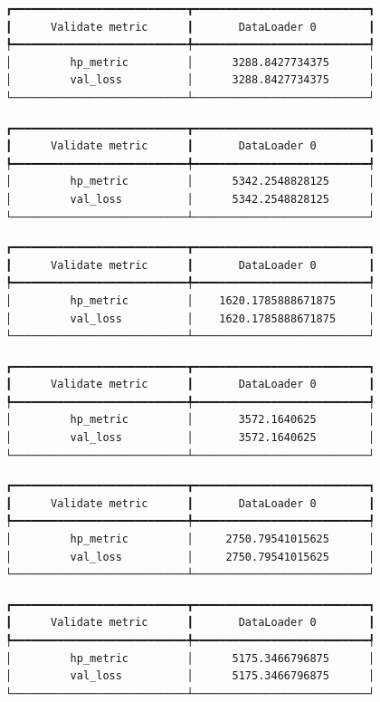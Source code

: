 \documentclass[
  letterpaper,
  DIV=11,
  numbers=noendperiod]{scrreprt}
\begin{document}
\begin{verbatim}
┏━━━━━━━━━━━━━━━━━━━━━━━━━━━┳━━━━━━━━━━━━━━━━━━━━━━━━━━━┓
┃      Validate metric      ┃       DataLoader 0        ┃
┡━━━━━━━━━━━━━━━━━━━━━━━━━━━╇━━━━━━━━━━━━━━━━━━━━━━━━━━━┩
│         hp_metric         │      3288.8427734375      │
│         val_loss          │      3288.8427734375      │
└───────────────────────────┴───────────────────────────┘
\end{verbatim}

\begin{verbatim}
┏━━━━━━━━━━━━━━━━━━━━━━━━━━━┳━━━━━━━━━━━━━━━━━━━━━━━━━━━┓
┃      Validate metric      ┃       DataLoader 0        ┃
┡━━━━━━━━━━━━━━━━━━━━━━━━━━━╇━━━━━━━━━━━━━━━━━━━━━━━━━━━┩
│         hp_metric         │      5342.2548828125      │
│         val_loss          │      5342.2548828125      │
└───────────────────────────┴───────────────────────────┘
\end{verbatim}

\begin{verbatim}
┏━━━━━━━━━━━━━━━━━━━━━━━━━━━┳━━━━━━━━━━━━━━━━━━━━━━━━━━━┓
┃      Validate metric      ┃       DataLoader 0        ┃
┡━━━━━━━━━━━━━━━━━━━━━━━━━━━╇━━━━━━━━━━━━━━━━━━━━━━━━━━━┩
│         hp_metric         │    1620.1785888671875     │
│         val_loss          │    1620.1785888671875     │
└───────────────────────────┴───────────────────────────┘
\end{verbatim}

\begin{verbatim}
┏━━━━━━━━━━━━━━━━━━━━━━━━━━━┳━━━━━━━━━━━━━━━━━━━━━━━━━━━┓
┃      Validate metric      ┃       DataLoader 0        ┃
┡━━━━━━━━━━━━━━━━━━━━━━━━━━━╇━━━━━━━━━━━━━━━━━━━━━━━━━━━┩
│         hp_metric         │       3572.1640625        │
│         val_loss          │       3572.1640625        │
└───────────────────────────┴───────────────────────────┘
\end{verbatim}

\begin{verbatim}
┏━━━━━━━━━━━━━━━━━━━━━━━━━━━┳━━━━━━━━━━━━━━━━━━━━━━━━━━━┓
┃      Validate metric      ┃       DataLoader 0        ┃
┡━━━━━━━━━━━━━━━━━━━━━━━━━━━╇━━━━━━━━━━━━━━━━━━━━━━━━━━━┩
│         hp_metric         │     2750.79541015625      │
│         val_loss          │     2750.79541015625      │
└───────────────────────────┴───────────────────────────┘
\end{verbatim}

\begin{verbatim}
┏━━━━━━━━━━━━━━━━━━━━━━━━━━━┳━━━━━━━━━━━━━━━━━━━━━━━━━━━┓
┃      Validate metric      ┃       DataLoader 0        ┃
┡━━━━━━━━━━━━━━━━━━━━━━━━━━━╇━━━━━━━━━━━━━━━━━━━━━━━━━━━┩
│         hp_metric         │      5175.3466796875      │
│         val_loss          │      5175.3466796875      │
└───────────────────────────┴───────────────────────────┘
\end{verbatim}
\end{document}
